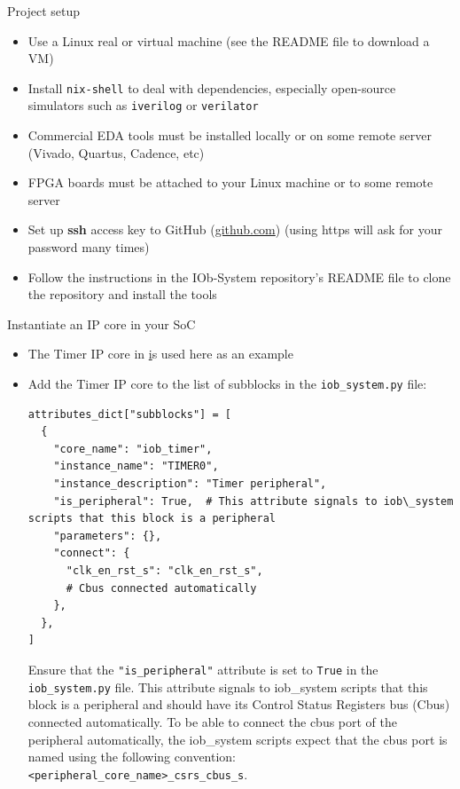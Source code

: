 \documentclass [xcolor=svgnames, t] {beamer}
\begin{document}
\begin{frame}{Project setup}
\begin{center}
  \begin{itemize}
  \item Use a Linux real or virtual machine (see the README file to download a VM)
    \item Install {\tt nix-shell} to deal with dependencies, especially open-source simulators such as {\tt iverilog} or {\tt verilator} 
    \item Commercial EDA tools must be installed locally or on some remote server (Vivado, Quartus, Cadence, etc) 
    \item FPGA boards must be attached to your Linux machine or to some remote server
    \item Set up {\bf ssh} access key to GitHub (\url{github.com}) (using https will ask for your password many times)
    \item Follow the instructions in the IOb-System repository's README file to clone the repository and install the tools
  \end{itemize}
\end{center}
\end{frame}


\begin{frame}[fragile]{Instantiate an IP core in your SoC}
  \begin{itemize}
  \item The Timer IP core in \href{https://github.com/IObundle/py2hwsw/tree/main/py2hwsw/lib/peripherals/iob_timer} is used here as an example
  \item Add the Timer IP core to the list of subblocks in the {\tt iob\_system.py} file:
    \begin{tiny}
      \begin{lstlisting}
attributes_dict["subblocks"] = [
  {
    "core_name": "iob_timer",
    "instance_name": "TIMER0",
    "instance_description": "Timer peripheral",
    "is_peripheral": True,  # This attribute signals to iob\_system scripts that this block is a peripheral
    "parameters": {},
    "connect": {
      "clk_en_rst_s": "clk_en_rst_s",
      # Cbus connected automatically
    },
  },
]
      \end{lstlisting}
      Ensure that the {\tt "is\_peripheral"} attribute is set to {\tt True} in the {\tt iob\_system.py} file. This attribute signals to iob\_system scripts that this block is a peripheral and should have its Control Status Registers bus (Cbus) connected automatically.
      To be able to connect the cbus port of the peripheral automatically, the iob\_system scripts expect that the cbus port is named using the following convention: {\tt <peripheral\_core\_name>\_csrs\_cbus\_s}.
    \end{tiny}
  \end{itemize}
\end{frame}
\end{document}
